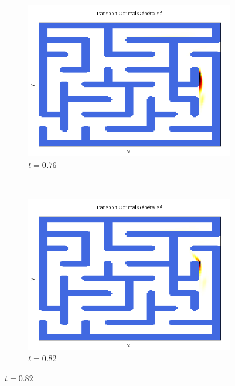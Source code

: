 \documentclass[a4paper,12pt]{article}
\begin{document}
\begin{figure}[!h]
\begin{subfigure}[b]{0.23\linewidth}
\includegraphics[width=\linewidth]{img/2DLabyrinthe/T_00077.png}
\caption*{$t=0.76$}
\end{subfigure}
~
\begin{subfigure}[b]{0.23\linewidth}
\includegraphics[width=\linewidth]{img/2DLabyrinthe/T_00083.png}
\caption*{$t=0.82$}
\end{subfigure}


\end{figure}
\end{document}

